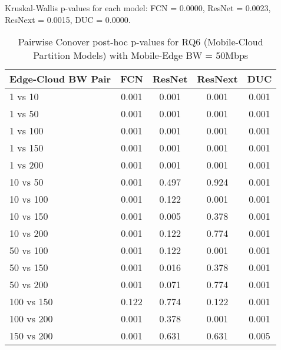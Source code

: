\begin{table}[h]
\centering
\caption{Pairwise Conover post-hoc p-values for RQ6 (Mobile-Cloud Partition Models) with Mobile-Edge BW = 50Mbps}
\label{tab:conover_mobile_cloud_partition_me50}
\smallskip
Kruskal-Wallis p-values for each model: FCN = 0.0000, ResNet = 0.0023, ResNext = 0.0015, DUC = 0.0000.

\begin{tabular}{lcccc}
\toprule
Edge-Cloud BW Pair & FCN & ResNet & ResNext & DUC \\
\midrule
1 vs 10 & 0.001 & 0.001 & 0.001 & 0.001 \\
1 vs 50 & 0.001 & 0.001 & 0.001 & 0.001 \\
1 vs 100 & 0.001 & 0.001 & 0.001 & 0.001 \\
1 vs 150 & 0.001 & 0.001 & 0.001 & 0.001 \\
1 vs 200 & 0.001 & 0.001 & 0.001 & 0.001 \\
10 vs 50 & 0.001 & 0.497 & 0.924 & 0.001 \\
10 vs 100 & 0.001 & 0.122 & 0.001 & 0.001 \\
10 vs 150 & 0.001 & 0.005 & 0.378 & 0.001 \\
10 vs 200 & 0.001 & 0.122 & 0.774 & 0.001 \\
50 vs 100 & 0.001 & 0.122 & 0.001 & 0.001 \\
50 vs 150 & 0.001 & 0.016 & 0.378 & 0.001 \\
50 vs 200 & 0.001 & 0.071 & 0.774 & 0.001 \\
100 vs 150 & 0.122 & 0.774 & 0.122 & 0.001 \\
100 vs 200 & 0.001 & 0.378 & 0.001 & 0.001 \\
150 vs 200 & 0.001 & 0.631 & 0.631 & 0.005 \\
\bottomrule
\end{tabular}
\end{table}

